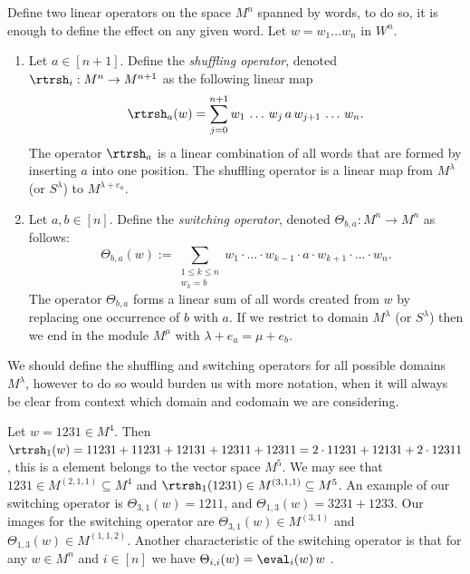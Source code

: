 \documentclass[11pt]{report}
\begin{document}
\begin{defn}
	\label{chpt4:def:shuffleandswitch}
	Define two linear operators on the space $M^{n}$ spanned by words, to do 
	so, it is enough to define the effect on any given word. Let $w = w_{1} 
	\dots w_{n}$ in	$W^{n}$.
	\begin{enumerate}
		\item Let  $a \in [n+1]$.
		Define the \emph{shuffling operator}, denoted $\rtrsh_{i}: M^{n} \to M^{n+1}$ as 
		the following linear map
		\[\rtrsh_{a}(w) = \sum_{j=0}^{n+1} w_{1} \, \dots \, w_{j} \, a \, 
		w_{j+1} \, \dots \, w_{n}.\]
		The operator $\rtrsh_{a}$ is a linear combination of all words that are 
		formed by inserting $a$ into one position. The shuffling operator is	a linear map from $M^{\lambda}$ (or $S^{\lambda}$) to $M^{\lambda+e_{a}}$.
		
		\item Let $a,b\in[n]$. Define the \emph{switching operator}, denoted
		$\Theta_{b,a}:M^{n}\rightarrow 	M^{n}$ as follows:
		\[\Theta_{b,a}(w) := \sum_{\substack{1 \leq k \leq n \\ w_{k} = b}} 
		w_{1}\cdot \ldots \cdot w_{k-1} \cdot a \cdot w_{k+1}\cdot \ldots \cdot 
		w_{n}.\]
		The operator $\Theta_{b,a}$ forms a linear sum of all words created 
		from $w$ by replacing one occurrence of $b$ with $a$. If we restrict to domain $M^{\lambda}$ (or $S^{\lambda}$) then we end in the module $M^{\mu}$ with $\lambda +e_{a} = \mu + e_{b}$. 
	\end{enumerate}
\end{defn}
\begin{rem}
	We should define the shuffling and switching operators for all possible domains $M^{\lambda}$, however to do so would burden us with more notation, when it will always be clear from context which domain and codomain we are considering.
\end{rem}

\begin{example}
	Let $w = 1231 \in M^{4}$. Then  $\rtrsh_{1}(w) = 11231 + 11231 + 12131 + 
	12311 +12311 = 2 \cdot 11231 + 12131 + 2 \cdot 12311$, this is a element 
	belongs to the vector space $M^{5}$. We may see that $1231 \in M^{(2,1,1)} \subseteq M^{4}$ and $\rtrsh_{1}(1231) \in M^{(3,1,1)} \subseteq M^{5}$.
	An example of our switching operator is 
	$\Theta_{3,1}(w) = 1211$, and $\Theta_{1,3} (w) = 3231 + 1233$. Our images for the switching operator are $\Theta_{3,1}(w) \in M^{(3,1)}$ and $\Theta_{1,3}(w) \in M^{(1,1,2)}$.
	Another characteristic of the switching operator is that for any $w \in M^{n}$ and $i\in[n]$ we have $\Theta_{i,i}(w) =  \eval_i(w) \, w$ .
\end{example}
\end{document}
